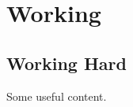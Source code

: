 \documentclass[../main.tex]{subfiles}
\begin{document}
\chapter{Working}
\section{Working Hard}
    Some useful content.
\end{document}
